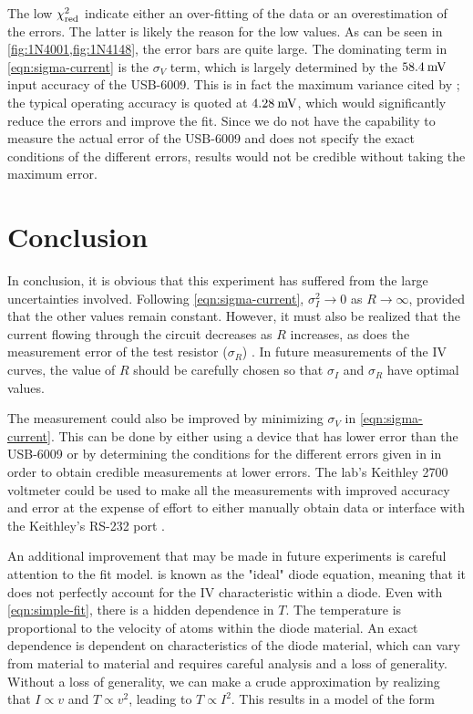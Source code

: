 \documentclass[reprint]{revtex4-1}
\begin{document}
The low $\chi^2_{\rm{red}}$ indicate either an over-fitting of the data or an overestimation of the errors. The latter is likely the reason for the low values. As can be seen in \cref{fig:1N4001,fig:1N4148}, the error bars are quite large. The dominating term in \cref{eqn:sigma-current} is the $\sigma_V$ term, which is largely determined by the $58.4\:\rm{mV}$ input accuracy of the USB-6009. This is in fact the maximum variance cited by \cite{Instruments2014}; the typical operating accuracy is quoted at $4.28\:\rm{mV}$, which would significantly reduce the errors and improve the fit. Since we do not have the capability to measure the actual error of the USB-6009 and \cite{Instruments2014} does not specify the exact conditions of the different errors, results would not be credible without taking the maximum error.

\section{Conclusion}

In conclusion, it is obvious that this experiment has suffered from the large uncertainties involved. Following \cref{eqn:sigma-current}, $\sigma_I^2 \to 0$ as $R \to \infty$, provided that the other values remain constant. However, it must also be realized that the current flowing through the circuit decreases as $R$ increases, as does the measurement error of the test resistor ($\sigma_R$) \cite{Keithley2003}. In future measurements of the IV curves, the value of $R$ should be carefully chosen so that $\sigma_I$ and $\sigma_R$ have optimal values.

The measurement could also be improved by minimizing $\sigma_V$ in \cref{eqn:sigma-current}. This can be done by either using a device that has lower error than the USB-6009 or by determining the conditions for the different errors given in \cite{Instruments2014} in order to obtain credible measurements at lower errors. The lab's Keithley 2700 voltmeter could be used to make all the measurements with improved accuracy and error at the expense of effort to either manually obtain data or interface with the Keithley's RS-232 port \cite{Keithley2003}.

An additional improvement that may be made in future experiments is careful attention to the fit model.  is known as the "ideal" diode equation, meaning that it does not perfectly account for the IV characteristic within a diode. Even with \cref{eqn:simple-fit}, there is a hidden dependence in $T$. The temperature is proportional to the velocity of atoms within the diode material. An exact dependence is dependent on characteristics of the diode material, which can vary from material to material and requires careful analysis and a loss of generality. Without a loss of generality, we can make a crude approximation by realizing that $I \propto v$ and $T \propto v^2$, leading to $T \propto I^2$. This results in a model of the form
\end{document}
